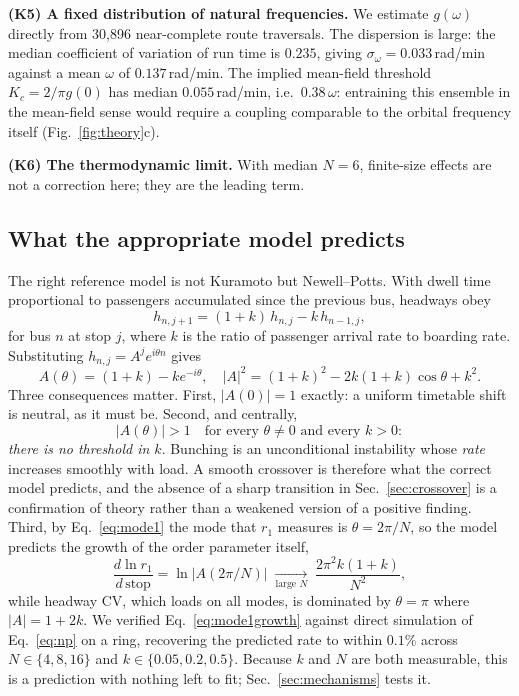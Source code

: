 \documentclass[9pt,twocolumn,twoside]{opticajnl}
\begin{document}
\textbf{(K5) A fixed distribution of natural frequencies.} We estimate $g(\omega)$ directly from
30{,}896 near-complete route traversals. The dispersion is large: the median coefficient of
variation of run time is $0.235$, giving $\sigma_\omega = 0.033$\,rad/min against a mean
$\omega$ of $0.137$\,rad/min. The implied mean-field threshold $K_c = 2/\pi g(0)$ has median
$0.055$\,rad/min, i.e.\ $0.38\,\omega$: entraining this ensemble in the mean-field sense would
require a coupling comparable to the orbital frequency itself (Fig.~\ref{fig:theory}c).

\textbf{(K6) The thermodynamic limit.} With median $N = 6$, finite-size effects are not a
correction here; they are the leading term.

\subsection{What the appropriate model predicts}

The right reference model is not Kuramoto but Newell--Potts. With dwell time proportional to
passengers accumulated since the previous bus, headways obey
\begin{equation}
h_{n,j+1} = (1+k)\,h_{n,j} - k\,h_{n-1,j},
\label{eq:np}
\end{equation}
for bus $n$ at stop $j$, where $k$ is the ratio of passenger arrival rate to boarding rate.
Substituting $h_{n,j} = A^j e^{i\theta n}$ gives
\begin{equation}
A(\theta) = (1+k) - k e^{-i\theta}, \quad
|A|^2 = (1+k)^2 - 2k(1+k)\cos\theta + k^2 .
\label{eq:growth}
\end{equation}
Three consequences matter. First, $|A(0)| = 1$ exactly: a uniform timetable shift is neutral, as
it must be. Second, and centrally,
\begin{equation}
|A(\theta)| > 1 \quad \text{for every } \theta \neq 0 \text{ and every } k > 0 :
\end{equation}
\emph{there is no threshold in $k$}. Bunching is an unconditional instability whose \emph{rate}
increases smoothly with load. A smooth crossover is therefore what the correct model predicts,
and the absence of a sharp transition in Sec.~\ref{sec:crossover} is a confirmation of theory
rather than a weakened version of a positive finding. Third, by Eq.~\eqref{eq:mode1} the mode
that $r_1$ measures is $\theta = 2\pi/N$, so the model predicts the growth of the order
parameter itself,
\begin{equation}
\frac{d \ln r_1}{d\,\text{stop}} = \ln|A(2\pi/N)| \;\xrightarrow[\text{large }N]{}\;
\frac{2\pi^2 k(1+k)}{N^2},
\label{eq:mode1growth}
\end{equation}
while headway CV, which loads on all modes, is dominated by $\theta = \pi$ where
$|A| = 1+2k$. We verified Eq.~\eqref{eq:mode1growth} against direct simulation of
Eq.~\eqref{eq:np} on a ring, recovering the predicted rate to within $0.1\%$ across
$N \in \{4,8,16\}$ and $k \in \{0.05, 0.2, 0.5\}$. Because $k$ and $N$ are both measurable, this
is a prediction with nothing left to fit; Sec.~\ref{sec:mechanisms} tests it.
\end{document}
